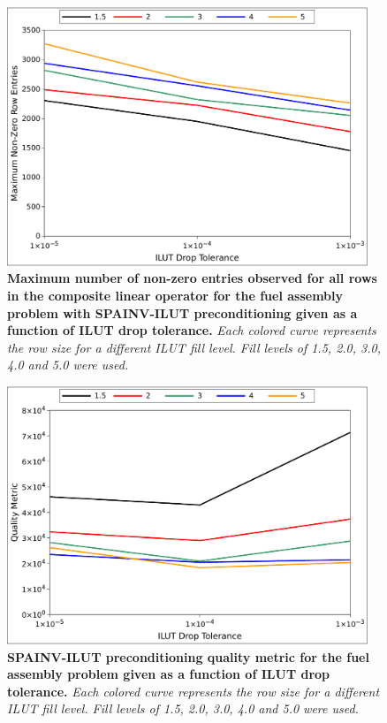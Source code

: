 \begin{figure}[t!]
  \begin{center}
    \includegraphics[width=4.25in]{chapters/spn_equations/psilut_size.pdf}
  \end{center}
  \caption{\textbf{Maximum number of non-zero entries observed for all
      rows in the composite linear operator for the fuel assembly
      problem with SPAINV-ILUT preconditioning given as a function of
      ILUT drop tolerance.} \textit{Each colored curve represents the
      row size for a different ILUT fill level. Fill levels of 1.5,
      2.0, 3.0, 4.0 and 5.0 were used.}}
 \label{fig:spainv_ilut_size}
\end{figure}

\begin{figure}[t!]
  \begin{center}
    \includegraphics[width=4.25in]{chapters/spn_equations/psilut_quality.pdf}
  \end{center}
  \caption{\textbf{SPAINV-ILUT preconditioning quality metric for the
      fuel assembly problem given as a function of ILUT drop
      tolerance.} \textit{Each colored curve represents the row size
      for a different ILUT fill level. Fill levels of 1.5, 2.0, 3.0,
      4.0 and 5.0 were used.}}
  \label{fig:spainv_ilut_quality}
\end{figure}

